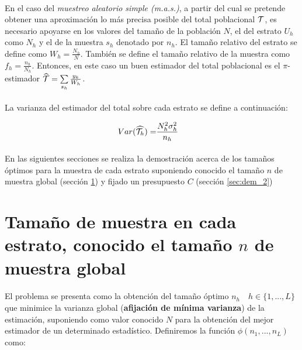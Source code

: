 \documentclass{article}
\begin{document}
    \paragraph{}
    En el caso del \emph{muestreo aleatorio simple (m.a.s.)}, a partir del cual se pretende obtener una aproximación lo más precisa posible del total poblacional $\mathcal{T}$, es necesario apoyarse en los valores del tamaño de la población $N$, el del estrato $U_h$ como $N_h$ y el de la muestra $s_h$ denotado por $n_h$. El tamaño relativo del estrato se define como $W_h = \frac{N_h}{N}$. También se define el tamaño relativo de la muestra como $f_h = \frac{n_h}{N_h}$. Entonces, en este caso un buen estimador del total poblacional es el $\pi$-estimador $\widehat{\mathcal{T}} = \sum\limits_{s_h} \frac{y_k}{W_h}$.

    \paragraph{}
    La varianza del estimador del total sobre cada estrato se define a continuación:

    \begin{align}
      Var(\widehat{\mathcal{T}_h}) =& \frac{N_h^2 \sigma_h^{2}}{n_h}
    \end{align}

    \paragraph{}
    En las siguientes secciones se realiza la demostración acerca de los tamaños óptimos para la muestra de cada estrato suponiendo conocido el tamaño $n$ de muestra global (sección \ref{sec:dem_1}) y fijado un presupuesto $C$ (sección \ref{sec:dem_2})


    \section{Tamaño de muestra en cada estrato, conocido el tamaño $n$ de muestra global}
    \label{sec:dem_1}

      \paragraph{}
      El problema se presenta como la obtención del tamaño óptimo $n_h \quad h \in \{1,..., L\}$ que minimice la varianza global (\textbf{afijación de mínima varianza}) de la estimación, suponiendo como valor conocido $N$ para la obtención del mejor estimador de un determinado estadístico. Definiremos la función $\phi(n_1, ..., n_L)$ como:
\end{document}
